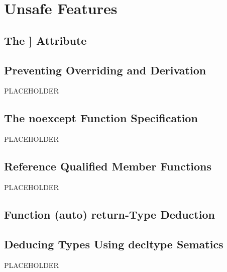 
\chapter[Unsafe Features]{Unsafe Features}\label{ch-unsafe}

\renewcommand{\cppxx}{C++11}

\newpage
{}
 \section[{\tt carries\_dependency}]{The {\SecCode [[carries\_dependency]]} Attribute}\label{carriesdependency}


\newpage
\section[{\tt final}]{Preventing Overriding and Derivation}\label{final}
%
PLACEHOLDER

\newpage
\section[{\tt noexcept} Specifier]{The {\SecCode noexcept} Function Specification}\label{noexcept-specifier}
%
PLACEHOLDER

\newpage
\section[Ref-Qualifiers]{Reference Qualified Member Functions}\label{refqualifiers}
%
PLACEHOLDER


\renewcommand{\cppxx}{C++14}

\newpage
{}
 \section[Deduced Return Type]{Function ({\SecCode auto}) {\SecCode return}-Type Deduction}\label{Function-Return-Type-Deduction}
\renewcommand{\cppxx}{C++14}


\newpage
\section[{\tt decltypeauto}]{Deducing Types Using {\SecCode decltype} Sematics}\label{decltypeauto}
%
PLACEHOLDER

